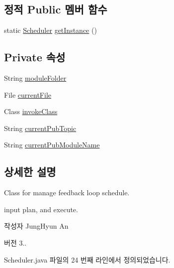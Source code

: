 \subsection*{정적 Public 멤버 함수}
\begin{DoxyCompactItemize}
\item 
static \mbox{\hyperlink{classcom_1_1github_1_1aites_1_1framework_1_1executor_1_1_scheduler}{Scheduler}} \mbox{\hyperlink{classcom_1_1github_1_1aites_1_1framework_1_1executor_1_1_scheduler_af136f59f2b8a958f6ba76cf74068e52b}{get\+Instance}} ()
\end{DoxyCompactItemize}
\subsection*{Private 속성}
\begin{DoxyCompactItemize}
\item 
String \mbox{\hyperlink{classcom_1_1github_1_1aites_1_1framework_1_1executor_1_1_scheduler_a724e814b924f7495a611c27efa8b7616}{module\+Folder}}
\item 
File \mbox{\hyperlink{classcom_1_1github_1_1aites_1_1framework_1_1executor_1_1_scheduler_a017bdd9271fe9827d1cb654eb6d7d5e9}{current\+File}}
\item 
Class \mbox{\hyperlink{classcom_1_1github_1_1aites_1_1framework_1_1executor_1_1_scheduler_a4f3e7f2f469b4bdc442fb6c86a1a649b}{invoke\+Class}}
\item 
String \mbox{\hyperlink{classcom_1_1github_1_1aites_1_1framework_1_1executor_1_1_scheduler_ae69931a45d8afef7275c3ba88bb59271}{current\+Pub\+Topic}}
\item 
String \mbox{\hyperlink{classcom_1_1github_1_1aites_1_1framework_1_1executor_1_1_scheduler_a036d601d648148fb655d33fba188306d}{current\+Pub\+Module\+Name}}
\end{DoxyCompactItemize}


\subsection{상세한 설명}
Class for manage feedback loop schedule. 

input plan, and execute. \begin{DoxyAuthor}{작성자}
Jung\+Hyun An 
\end{DoxyAuthor}
\begin{DoxyVersion}{버전}
3.. 
\end{DoxyVersion}


Scheduler.\+java 파일의 24 번째 라인에서 정의되었습니다.



